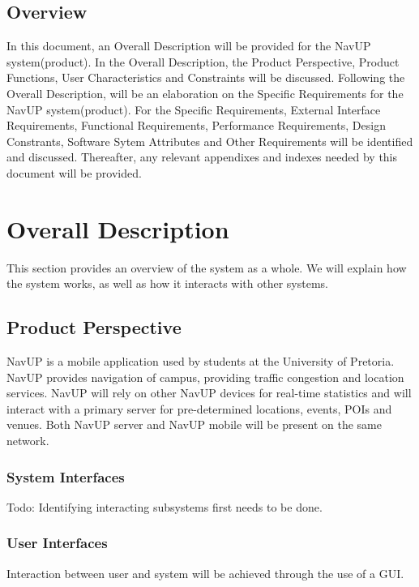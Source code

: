 \documentclass{article}
\begin{document}
    \subsection{Overview}
		\begin{flushleft}
			In this document, an Overall Description will be provided for the NavUP system(product). In the Overall Description, the Product Perspective, Product Functions, User Characteristics and Constraints will be discussed. Following the Overall Description, will be an elaboration on the Specific Requirements for the NavUP system(product). For the Specific Requirements, External Interface Requirements, Functional Requirements, Performance Requirements, Design Constrants, Software Sytem Attributes and Other Requirements will be identified and discussed.
Thereafter, any relevant appendixes and indexes needed by this document will be provided.
		\end{flushleft}
\section{Overall Description}

    \begin{flushleft}
        This section provides an overview of the system as a whole. We will explain how the system works, as well as how it interacts with other systems.
    \end{flushleft}
    
    
    \subsection{Product Perspective}
    
        NavUP is a mobile application used by students at the University of Pretoria. NavUP provides navigation of campus, providing traffic congestion and location services. NavUP will rely on other NavUP devices for real-time statistics and will interact with a primary server for pre-determined locations, events, POIs and venues. Both NavUP server and NavUP mobile will be present on the same network.
        \subsubsection{System Interfaces}
        Todo: Identifying interacting subsystems first needs to be done.
        \subsubsection{User Interfaces}
            Interaction between user and system will be achieved through the use of a GUI.        
\end{document}
